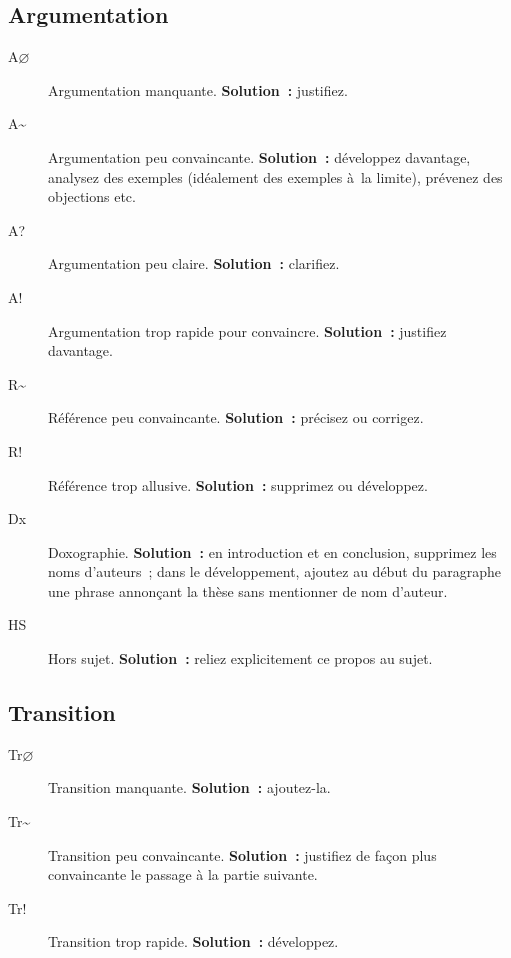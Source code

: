 \documentclass[a4paper,11pt]{article}
\begin{document}
\subsection{Argumentation}
\label{sec:org30ebaa4}
\begin{description}
\item[{A\(\varnothing\)}] Argumentation manquante. \textbf{Solution :} justifiez.
\item[{A\textasciitilde{}}] Argumentation peu convaincante. \textbf{Solution :} développez
davantage, analysez des exemples (idéalement des exemples à la
limite), prévenez des objections etc.
\item[{A\string?}] Argumentation peu claire. \textbf{Solution :} clarifiez.
\item[{A\string!}] Argumentation trop rapide pour convaincre. \textbf{Solution :}
justifiez davantage.
\item[{R\textasciitilde{}}] Référence peu convaincante. \textbf{Solution :} précisez ou corrigez.
\item[{R\string!}] Référence trop allusive. \textbf{Solution :} supprimez ou
développez.
\item[{Dx}] Doxographie. \textbf{Solution :} en introduction et en conclusion,
supprimez les noms d'auteurs ; dans le développement, ajoutez au début
du paragraphe une phrase annonçant la thèse sans mentionner de nom
d'auteur.
\item[{HS}] Hors sujet. \textbf{Solution :} reliez explicitement ce propos au
sujet.
\end{description}

\subsection{Transition}
\label{sec:orgef7b814}
\begin{description}
\item[{Tr\(\varnothing\)}] Transition manquante. \textbf{Solution :} ajoutez-la.
\item[{Tr\textasciitilde{}}] Transition peu convaincante. \textbf{Solution :} justifiez de façon
plus convaincante le passage à la partie suivante.
\item[{Tr\string!}] Transition trop rapide. \textbf{Solution :} développez.
\end{description}
\end{document}
